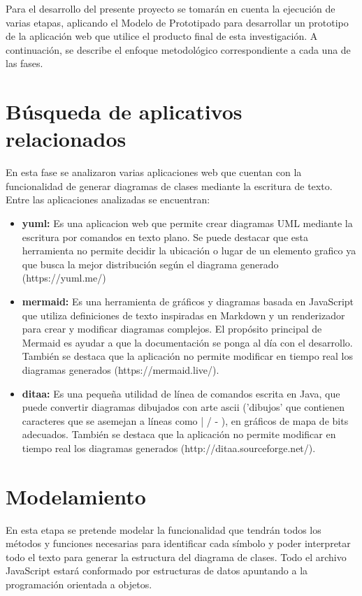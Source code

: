 \documentclass[12pt, openany, xcolor=table]{book}
\begin{document}
	Para el desarrollo del presente proyecto se tomarán en cuenta la ejecución de varias etapas, aplicando el Modelo de Prototipado para desarrollar un prototipo de la aplicación web que utilice el producto final de esta investigación. A continuación, se describe el enfoque metodológico correspondiente a cada una de las fases. 
	
	\section{Búsqueda de aplicativos relacionados}
	
	En esta fase se analizaron varias aplicaciones web que cuentan con la funcionalidad de generar diagramas de clases mediante la escritura de texto. Entre las aplicaciones analizadas se encuentran:
	
	\begin{itemize}
		\item \textbf{yuml: }Es una aplicacion web que permite crear diagramas UML mediante la escritura por comandos en texto plano. Se puede destacar que esta herramienta no permite decidir la ubicación o lugar de un elemento grafico ya que busca la mejor distribución según el diagrama generado (https://yuml.me/)
		
		\item \textbf{mermaid: }Es una herramienta de gráficos y diagramas basada en JavaScript que utiliza definiciones de texto inspiradas en Markdown y un renderizador para crear y modificar diagramas complejos. El propósito principal de Mermaid es ayudar a que la documentación se ponga al día con el desarrollo. También se destaca que la aplicación no permite modificar en tiempo real los diagramas generados (https://mermaid.live/).
		
		\item \textbf{ditaa: }Es una pequeña utilidad de línea de comandos escrita en Java, que puede convertir diagramas dibujados con arte ascii ('dibujos' que contienen caracteres que se asemejan a líneas como | / - ), en gráficos de mapa de bits adecuados. También se destaca que la aplicación no permite modificar en tiempo real los diagramas generados (http://ditaa.sourceforge.net/). 
	\end{itemize}
	
	\section{Modelamiento}
	
	En esta etapa se pretende modelar la funcionalidad que tendrán todos los métodos y funciones necesarias para identificar cada símbolo y poder interpretar todo el texto para generar la estructura del diagrama de clases.
	Todo el archivo JavaScript estará conformado por estructuras de datos apuntando a la programación orientada a objetos.
	
\end{document}

